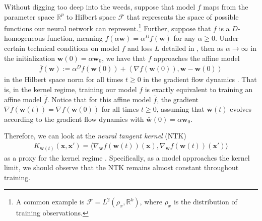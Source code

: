 \documentclass{article}
\begin{document}
Without digging too deep into the weeds, suppose that model $f$ maps from the parameter space $\mathbb{R}^p$ to Hilbert space $\mathcal{F}$ that represents  the space of possible functions our neural network can represent.\footnote{A common example is $\mathcal{F} = L^2(\rho_x, \mathbb{R}^k)$, where $\rho_x$ is the distribution of training observations.} Further, suppose that $f$ is a $D$-homogeneous function, meaning $f(\alpha \boldsymbol{w}) = \alpha^D f(\boldsymbol{w})$ for any $\alpha \geq 0$. Under certain technical conditions on model $f$ and loss $L$ detailed in \cite{chizat2018lazy}, then as $\alpha \rightarrow \infty$ in the initialization $\boldsymbol{w}(0) = \alpha \boldsymbol{w}_0$, we have that $f$ approaches the affine model 
\begin{align}\label{linearizedmodel}
    \bar{f}(\boldsymbol{w}) := \alpha^D f(\boldsymbol{w}(0)) + \left\langle \nabla f(\boldsymbol{w}(0)), \boldsymbol{w} - \boldsymbol{w}(0) \right\rangle
\end{align}
in the Hilbert space norm for all times $t \geq 0$ in the gradient flow dynamics \cite{chizat2018lazy}. That is, in the kernel regime, training our model $f$ is exactly equivalent to training an affine model $\bar{f}$. Notice that for this affine model $\bar{f}$, the gradient $\nabla \bar{f}(\bar{\boldsymbol{w}}(t)) = \nabla f(\bar{\boldsymbol{w}}(0))$ for all times $t \geq 0$, assuming that $\bar{\boldsymbol{w}}(t)$ evolves according to the gradient flow dynamics with $\bar{\boldsymbol{w}}(0) = \alpha \boldsymbol{w}_0$.

Therefore, we can look at the \textit{neural tangent kernel} (NTK)
\begin{align*}
    K_{\boldsymbol{w}(t)}(\boldsymbol{x}, \boldsymbol{x}') = \langle \nabla_{\boldsymbol{w}} f(\boldsymbol{w}(t))(\boldsymbol{x}), \nabla_{\boldsymbol{w}} f(\boldsymbol{w}(t))(\boldsymbol{x}') \rangle
\end{align*}
as a proxy for the kernel regime \cite{jacot2018neural}. Specifically, as a model approaches the kernel limit, we should observe that the NTK remains almost constant throughout training. 
\end{document}
